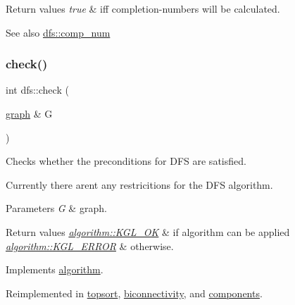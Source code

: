 \begin{DoxyRetVals}{Return values}
{\em true} & iff completion-\/numbers will be calculated. \\
\hline
\end{DoxyRetVals}
\begin{DoxySeeAlso}{See also}
\mbox{\hyperlink{classdfs_aceb066c806cb0beb5688b167a17387c7}{dfs\+::comp\+\_\+num}} 
\end{DoxySeeAlso}
\mbox{\label{classdfs_a1af70060897529e67910f589b047e576}} 
\subsubsection{\texorpdfstring{check()}{check()}}
{\footnotesize\ttfamily int dfs\+::check (\begin{DoxyParamCaption}\item[{\mbox{\hyperlink{classgraph}{graph}} \&}]{G }\end{DoxyParamCaption})\hspace{0.3cm}{\ttfamily [virtual]}}



Checks whether the preconditions for D\+FS are satisfied. 

Currently there aren\textquotesingle{}t any restricitions for the D\+FS algorithm.


\begin{DoxyParams}{Parameters}
{\em G} & graph. \\
\hline
\end{DoxyParams}

\begin{DoxyRetVals}{Return values}
{\em \mbox{\hyperlink{classalgorithm_af1a0078e153aa99c24f9bdf0d97f6710aae4c1cd7fe8d8cf4b143241a6e7c31cf}{algorithm\+::\+K\+G\+L\+\_\+\+OK}}} & if algorithm can be applied \\
\hline
{\em \mbox{\hyperlink{classalgorithm_af1a0078e153aa99c24f9bdf0d97f6710ae67bf27b2ef31f73e545a7f9f4a69556}{algorithm\+::\+K\+G\+L\+\_\+\+E\+R\+R\+OR}}} & otherwise. \\
\hline
\end{DoxyRetVals}


Implements \mbox{\hyperlink{classalgorithm_a05c0f25463eb35a77b2d73fc06bb2c0e}{algorithm}}.



Reimplemented in \mbox{\hyperlink{classtopsort_a777a9a68c4081d22e7b698ed3c515343}{topsort}}, \mbox{\hyperlink{classbiconnectivity_a372daa6b7897a5b284ee4695584ca81c}{biconnectivity}}, and \mbox{\hyperlink{classcomponents_aeeda901d02c65d6c31c8b6148540d7c1}{components}}.

